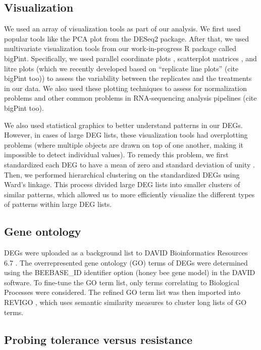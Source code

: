 \documentclass{bmcart}
\begin{document}
\begin{linenumbers}
\begin{doublespacing}
\subsection*{Visualization}

We used an array of visualization tools as part of our analysis. We first used popular tools like the PCA plot \cite{pca} from the DESeq2 package. After that, we used multivariate visualization tools from our work-in-progress R package called bigPint. Specifically, we used parallel coordinate plots \cite{origPCP}, scatterplot matrices \cite{scatMat}, and litre plots (which we recently developed based on ``replicate line plots'' \cite{jds} (cite bigPint too)) to assess the variability between the replicates and the treatments in our data. We also used these plotting techniques to assess for normalization problems and other common problems in RNA-sequencing analysis pipelines \cite{jds} (cite bigPint too).

We also used statistical graphics to better understand patterns in our DEGs. However, in cases of large DEG lists, these visualization tools had overplotting problems (where multiple objects are drawn on top of one another, making it impossible to detect individual values). To remedy this problem, we first standardized each DEG to have a mean of zero and standard deviation of unity \cite{Chandrasekhar, deSouto}. Then, we performed hierarchical clustering on the standardized DEGs using Ward's linkage. This process divided large DEG lists into smaller clusters of similar patterns, which allowed us to more efficiently visualize the different types of patterns within large DEG lists.

\subsection*{Gene ontology}

DEGs were uploaded as a background list to DAVID Bioinformatics Resources 6.7 \cite{davidBio, davidBio2}. The overrepresented gene ontology (GO) terms of DEGs were determined using the BEEBASE\_ID identifier option (honey bee gene model) in the DAVID software. To fine-tune the GO term list, only terms correlating to Biological Processes were considered. The refined GO term list was then imported into REVIGO \cite{revigo}, which uses semantic similarity measures to cluster long lists of GO terms.

\subsection*{Probing tolerance versus resistance}


\end{doublespacing}
\end{linenumbers}
\end{document}
